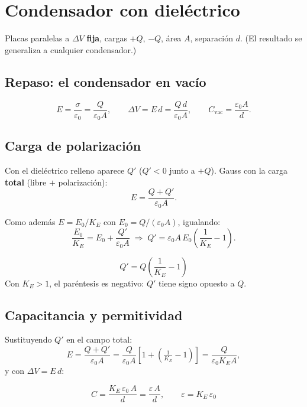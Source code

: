\documentclass[12pt,a4paper]{article}
\begin{document}
\section{Condensador con dieléctrico}

Placas paralelas a $\Delta V$ \textbf{fija}, cargas $+Q$, $-Q$, área $A$,
separación $d$. (El resultado se generaliza a cualquier condensador.)

\subsection{Repaso: el condensador en vacío}

\[
E = \frac{\sigma}{\varepsilon_0} = \frac{Q}{\varepsilon_0 A},
\qquad \Delta V = E\,d = \frac{Q\,d}{\varepsilon_0 A},
\qquad C_{\text{vac}} = \frac{\varepsilon_0 A}{d}.
\]

\subsection{Carga de polarización}

Con el dieléctrico relleno aparece $Q'$ ($Q'<0$ junto a $+Q$). Gauss con
la carga \textbf{total} (libre $+$ polarización):
\[
E = \frac{Q + Q'}{\varepsilon_0 A}.
\]

Como además $E = E_0/K_E$ con $E_0 = Q/(\varepsilon_0 A)$, igualando:
\[
\frac{E_0}{K_E} = E_0 + \frac{Q'}{\varepsilon_0 A}
\;\Longrightarrow\;
Q' = \varepsilon_0 A\, E_0\left(\frac{1}{K_E} - 1\right).
\]

\begin{keybox}
  \[
  \boxed{Q' = Q\left(\frac{1}{K_E} - 1\right)}
  \]
  Con $K_E>1$, el paréntesis es negativo: $Q'$ tiene signo opuesto a $Q$.
\end{keybox}

\subsection{Capacitancia y permitividad}

Sustituyendo $Q'$ en el campo total:
\[
E = \frac{Q+Q'}{\varepsilon_0 A}
  = \frac{Q}{\varepsilon_0 A}\left[1 + \left(\tfrac{1}{K_E}-1\right)\right]
  = \frac{Q}{\varepsilon_0 K_E A},
\]
y con $\Delta V = E\,d$:

\begin{keybox}
  \[
  \boxed{C = \frac{K_E\,\varepsilon_0\, A}{d} = \frac{\varepsilon\, A}{d}},
  \qquad
  \boxed{\varepsilon = K_E\,\varepsilon_0}
  \]
\end{keybox}
\end{document}
